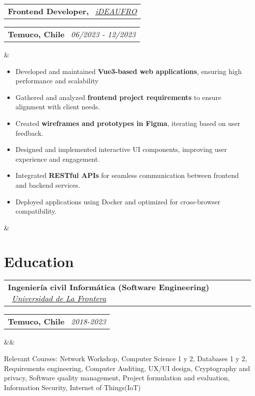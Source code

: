 \documentclass[11pt,a4paper,sans]{moderncv}
\makeatletter
\newcommand{\sectionMargin}{-3mm}
\newcommand*{\customcventry}[7][.13em]{
    \begin{tabular}{@{}l}
    {\bfseries #4} \
    {\itshape #3}
    \end{tabular}
    \hfill
    \begin{tabular}{l@{}}
    {\bfseries #5} \
    {\itshape #2}
    \end{tabular}
    \ifx&#7&%
    \else{\
    \begin{minipage}{\maincolumnwidth}%
    \small#7%
    \end{minipage}}\fi%
    \par\addvspace{#1}
}
\makeatother
\begin{document}
{  \vspace*{2mm}
  \customcventry
  {06/2023 ‐ 12/2023}
  {\href{https://ideaufro.com/}{\underline{iDEAUFRO}}}
  {Frontend Developer,}
  {Temuco, Chile}{}
  {{\begin{itemize}[leftmargin=0.6cm, noitemsep, label={\textbullet}]
    \item Developed and maintained \textbf{Vue3-based web applications}, ensuring high performance and scalability
    \item Gathered and analyzed \textbf{frontend project requirements} to ensure alignment with client needs.
    \item Created \textbf{wireframes and prototypes in Figma}, iterating based on user feedback.
    \item Designed and implemented interactive UI components, improving user experience and engagement.
    \item Integrated \textbf{RESTful APIs} for seamless communication between frontend and backend services.
    \item Deployed applications using Docker and optimized for cross-browser compatibility.
  \end{itemize}}
  }
}

\vspace*{\sectionMargin}
\section{Education}
\customcventry
    {2018-2023}
    {\href{https://1drv.ms/b/c/13c8ae619d64655e/EV5lZJ1hrsgggBOHLAAAAAABHh9OZUbWLd2nx7PTa_OSsg?e=Fedmge}{\underline{Universidad de La Frontera}} }
    {Ingeniería civil Informática (Software Engineering)}
    {Temuco, Chile}
    {}{}
    {Relevant Courses: 
        Network Workshop, 
        Computer Science 1 y 2, 
        Databases 1 y 2, 
        Requirements engineering,
        Computer Auditing,
        UX/UI design,
        Cryptography and privacy,
        Software quality management,
        Project formulation and evaluation,
        Information Security,
        Internet of Things(IoT)
}

\vspace*{\sectionMargin}
\end{document}
